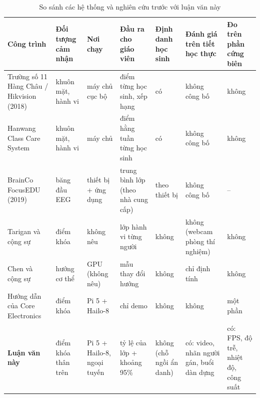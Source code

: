\begin{table}[htbp]\footnotesize
\caption{So sánh các hệ thống và nghiên cứu trước với luận văn này}\label{tab:prior-systems-and-studies-compared-with-}
\begin{tabularx}{\textwidth}{*{7}{>{\raggedright\arraybackslash}X}}
\toprule
\textbf{Công trình} & \textbf{Đối tượng cảm nhận} & \textbf{Nơi chạy} & \textbf{Đầu ra cho giáo viên} & \textbf{Định danh học sinh} & \textbf{Đánh giá trên tiết học thực} & \textbf{Đo trên phần cứng biên} \\
\midrule
Trường số 11 Hàng Châu / Hikvision (2018) & khuôn mặt, hành vi & máy chủ cục bộ & điểm từng học sinh, xếp hạng & có & không công bố & không \\
Hanwang Class Care System & khuôn mặt, hành vi & máy chủ & điểm hằng tuần từng học sinh & có & không công bố & không \\
BrainCo FocusEDU (2019) & băng đầu EEG & thiết bị + ứng dụng & trung bình lớp (theo nhà cung cấp) & theo thiết bị & không công bố & -- \\
Tarigan và cộng sự~\cite{b2} & 7 điểm khóa & không nêu & lớp hành vi từng người & không & không (webcam phòng thí nghiệm) & không \\
Chen và cộng sự~\cite{b1} & hướng cơ thể & GPU (không nêu) & mẫu thay đổi hướng & không & chỉ định tính & không \\
Hướng dẫn của Core Electronics \cite{b6} & 17 điểm khóa & Pi 5 + Hailo-8 & chỉ demo & không & không & một phần \\
\textbf{Luận văn này} & 13 điểm khóa thân trên & Pi 5 + Hailo-8, ngoại tuyến & tỷ lệ của lớp + khoảng 95\% & không (chỗ ngồi ẩn danh) & có: video, nhãn người gán, buổi dàn dựng & có: FPS, độ trễ, nhiệt độ, công suất \\
\bottomrule
\end{tabularx}
\end{table}
